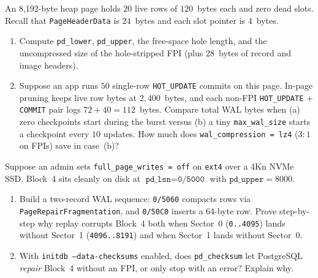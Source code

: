 \begin{exercise}
\label{ch04:ex-fpi-amplification}
An 8,192-byte heap page holds $20$ live rows of $120$~bytes each and zero dead slots. Recall that \texttt{PageHeaderData} is $24$~bytes and each slot pointer is $4$~bytes.
\begin{enumerate}
  \item Compute \texttt{pd\_lower}, \texttt{pd\_upper}, the free-space hole length, and the uncompressed size of the hole-stripped FPI (plus $28$~bytes of record and image headers).
  \item Suppose an app runs $50$ single-row \texttt{HOT\_UPDATE} commits on this page. In-page pruning keeps live row bytes at $2{,}400$~bytes, and each non-FPI \texttt{HOT\_UPDATE} + \texttt{COMMIT} pair logs $72 + 40 = 112$~bytes. Compare total WAL bytes when (a) zero checkpoints start during the burst versus (b) a tiny \texttt{max\_wal\_size} starts a checkpoint every $10$ updates. How much does \texttt{wal\_compression = lz4} ($3\colon 1$ on FPIs) save in case~(b)?
\end{enumerate}
\end{exercise}

\begin{exercise}
\label{ch04:ex-prove-torn-failure}
Suppose an admin sets \texttt{full\_page\_writes = off} on \texttt{ext4} over a 4Kn NVMe SSD. Block~4 sits cleanly on disk at $\texttt{pd\_lsn} = \texttt{0/5000}$ with $\texttt{pd\_upper} = 8000$.
\begin{enumerate}
  \item Build a two-record WAL sequence: \texttt{0/5060} compacts rows via \texttt{PageRepairFragmentation}, and \texttt{0/50C0} inserts a 64-byte row. Prove step-by-step why replay corrupts Block~4 both when Sector~0 (\texttt{0..4095}) lands without Sector~1 (\texttt{4096..8191}) and when Sector~1 lands without Sector~0.
  \item With \texttt{initdb --data-checksums} enabled, does \texttt{pd\_checksum} let PostgreSQL \emph{repair} Block~4 without an FPI, or only stop with an error? Explain why.
\end{enumerate}
\end{exercise}

